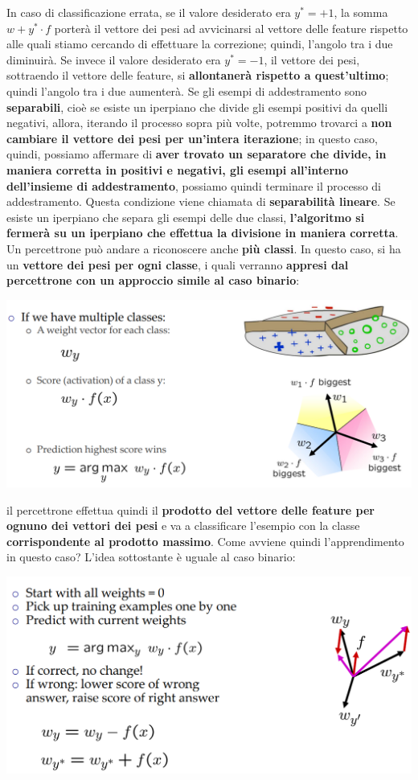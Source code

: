 \documentclass[12pt]{article}
\begin{document}
In caso di classificazione errata, se il valore desiderato era $y^* = +1$, la somma $w + y^* \cdot f$ porterà il vettore dei pesi ad avvicinarsi al vettore
delle feature rispetto alle quali stiamo cercando di effettuare la correzione; quindi, l'angolo tra i due diminuirà.
Se invece il valore desiderato era $y^* = -1$, il vettore dei pesi, sottraendo il vettore delle feature, si \textbf{allontanerà rispetto a quest'ultimo}; quindi l'angolo tra i due aumenterà.
Se gli esempi di addestramento sono \textbf{separabili}, cioè se esiste un iperpiano che divide gli esempi positivi da quelli negativi, allora, iterando il processo sopra più volte, potremmo trovarci
a \textbf{non cambiare il vettore dei pesi per un'intera iterazione}; in questo caso, quindi, possiamo affermare di \textbf{aver trovato un separatore che divide, in maniera corretta in positivi e negativi, gli esempi all'interno dell'insieme di addestramento}, possiamo quindi terminare il processo di addestramento.
Questa condizione viene chiamata di \textbf{separabilità lineare}.
Se esiste un iperpiano che separa gli esempi delle due classi, \textbf{l'algoritmo si fermerà su un iperpiano che effettua la divisione in maniera corretta}.
Un percettrone può andare a riconoscere anche \textbf{più classi}. In questo caso, si ha un \textbf{vettore dei pesi per ogni classe}, i quali verranno 
\textbf{appresi dal percettrone con un approccio simile al caso binario}:
\begin{center}
    \includegraphics[width =0.90\linewidth]{Images/96.PNG}
\end{center}
il percettrone effettua quindi il \textbf{prodotto del vettore delle feature per ognuno dei vettori dei pesi} e va a classificare l'esempio con
la classe \textbf{corrispondente al prodotto massimo}. Come avviene quindi l'apprendimento in questo caso? L'idea sottostante è uguale al caso binario:
\begin{center}
    \includegraphics[width =1\linewidth]{Images/97.PNG}
\end{center}
\end{document}

